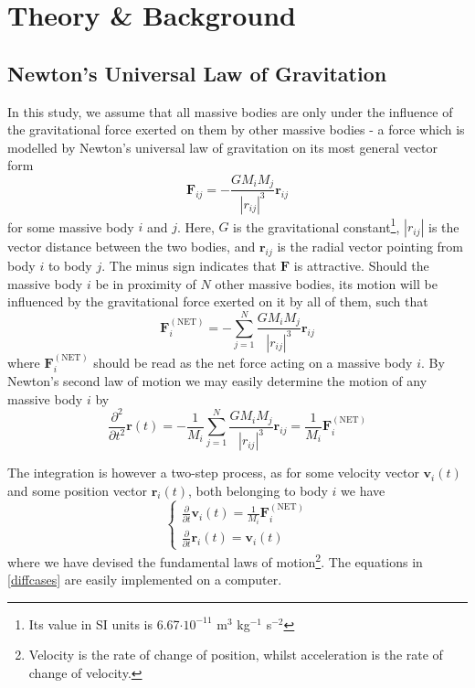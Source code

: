 \section{Theory \& Background}
	\subsection{Newton's Universal Law of Gravitation}
	In this study, we assume that all massive bodies are only under the influence of the gravitational force exerted on them by other massive bodies - a force which is modelled by Newton's universal law of gravitation on its most general vector form
	\begin{equation}
		\mathbf{F}_{ij} = -\frac{GM_iM_j}{|r_{ij}|^3}\mathbf{r}_{ij}
		\label{gravitation}
	\end{equation}
	for some massive body $i$ and $j$. Here, $G$ is the gravitational constant\footnote{Its value in SI units is 6.67$\cdot10^{-11}$ m$^3$ kg$^{-1}$ s$^{-2}$}, $|r_{ij}|$ is the vector distance between the two bodies, and $\mathbf{r}_{ij}$ is the radial vector pointing from body $i$ to body $j$. The minus sign indicates that $\mathbf{F}$ is attractive. Should the massive body $i$ be in proximity of $N$ other massive bodies, its motion will be influenced by the gravitational force exerted on it by all of them, such that
	\[
	\mathbf{F}^{(\text{NET})}_{i} = -\sum_{j=1}^{N} \frac{GM_iM_j}{|r_{ij}|^3}\mathbf{r}_{ij}
	\]
	where $\mathbf{F}^{(\text{NET})}_i$ should be read as the net force acting on a massive body $i$. By Newton's second law of motion we may easily determine the motion of any massive body $i$ by
	\begin{equation}
		\frac{\partial^2}{\partial t^2}\mathbf{r}(t) = -\frac{1}{M_i}\sum_{j=1}^{N} \frac{GM_iM_j}{|r_{ij}|^3}\mathbf{r}_{ij} = \frac{1}{M_i}\mathbf{F}^{(\text{NET})}_i
		\label{difftosolve}
	\end{equation}
	
	The integration is however a two-step process, as for some velocity vector $\mathbf{v}_i(t)$ and some position vector $\mathbf{r}_i(t)$, both belonging to body $i$ we have
	\begin{equation}
		\begin{cases}
		\frac{\partial}{\partial t}\mathbf{v}_i(t) = \frac{1}{M_i}\mathbf{F}^{(\text{NET})}_i\\
		\frac{\partial}{\partial t}\mathbf{r}_i(t) = \mathbf{v}_i(t)
		\label{diffcases}
		\end{cases}
	\end{equation}
	where we have devised the fundamental laws of motion\footnote{Velocity is the rate of change of position, whilst acceleration is the rate of change of velocity.}. The equations in \eqref{diffcases} are easily implemented on a computer.
